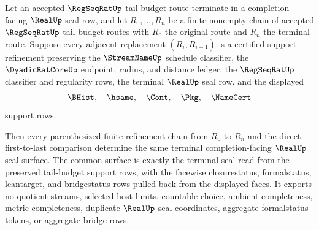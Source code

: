 \begin{theorem}
\label{thm:regseqrat-tail-budget-chain-refinement-exhaustion}
Let an accepted $\RegSeqRatUp$ tail-budget route terminate in a
completion-facing $\RealUp$ seal row, and let
$R_0,\ldots,R_n$ be a finite nonempty chain of accepted $\RegSeqRatUp$
tail-budget routes with $R_0$ the original route and $R_n$ the terminal route.
Suppose every adjacent replacement $(R_i,R_{i+1})$ is a certified support
refinement preserving the $\StreamNameUp$ schedule classifier, the
$\DyadicRatCoreUp$ endpoint, radius, and distance ledger, the $\RegSeqRatUp$
classifier and regularity rows, the terminal $\RealUp$ seal row, and the
displayed
$$
\BHist,\quad \hsame,\quad \Cont,\quad \Pkg,\quad \NameCert
$$
support rows.

Then every parenthesized finite refinement chain from $R_0$ to $R_n$ and the
direct first-to-last comparison determine the same terminal completion-facing
$\RealUp$ seal surface. The common surface is exactly the terminal seal read
from the preserved tail-budget support rows, with the facewise closurestatus,
formalstatus, leantarget, and bridgestatus rows pulled back from the displayed
faces. It exports no quotient streams, selected host limits, countable choice,
ambient completeness, metric completeness, duplicate $\RealUp$ seal
coordinates, aggregate formalstatus tokens, or aggregate bridge rows.
\end{theorem}
